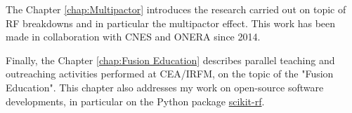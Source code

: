 The Chapter \ref{chap:Multipactor} introduces the research carried out on topic of RF breakdowns and in particular the multipactor effect. This work has been made in collaboration with CNES and ONERA since 2014.

Finally, the Chapter \ref{chap:Fusion Education} describes parallel teaching and outreaching activities performed at CEA/IRFM, on the topic of the "Fusion Education". This chapter also addresses my work on open-source software developments, in particular on the Python package \href{http://scikit-rf.org/}{scikit-rf}. 

